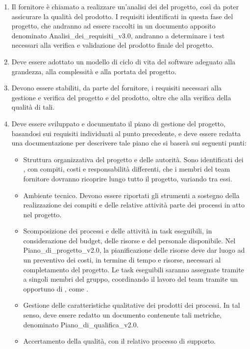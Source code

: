 \begin{enumerate}
    \item Il fornitore è chiamato a realizzare un'analisi dei  del progetto, così da poter assicurare la qualità del prodotto. I requisiti identificati in questa fase del progetto, che andranno ad essere raccolti in un documento apposito denominato Analisi\_dei\_requisiti\_v3.0, andranno a determinare i test necessari alla verifica e validazione del prodotto finale del progetto.
    \item Deve essere adottato un modello di ciclo di vita del software adeguato alla grandezza, alla complessità e alla portata del progetto.
    \item Devono essere stabiliti, da parte del fornitore, i requisiti necessari alla gestione e verifica del progetto e del prodotto, oltre che alla verifica della qualità di tali.
    \item Deve essere sviluppato e documentato il piano di gestione del progetto, basandosi sui requisiti individuati al punto precedente, e deve essere redatta una documentazione per descrivere tale piano che si baserà sui seguenti punti:
    \begin{itemize}
        \item Struttura organizzativa del progetto e delle autorità. Sono identificati dei , con compiti, costi e responsabilità differenti, che i membri del team fornitore dovranno ricoprire lungo tutto il progetto, variando tra essi.
        \item Ambiente tecnico. Devono essere riportati gli strumenti a sostegno della realizzazione dei compiti e delle relative attività parte dei processi in atto nel progetto.
        \item Scomposizione dei processi e delle attività in task eseguibili, in considerazione del budget, delle risorse e del personale disponibile. Nel Piano\_di\_progetto\_v2.0, la pianificazione delle risorse deve dar luogo ad un preventivo dei costi, in termine di tempo e risorse, necessari al completamento del progetto. Le task eseguibili saranno assegnate tramite  a singoli membri del gruppo, coordinando il lavoro del team tramite un opportuno  di , come .
        \item Gestione delle caratteristiche qualitative dei prodotti dei processi. In tal senso, deve essere redatto un documento contenente tali metriche, denominato Piano\_di\_qualifica\_v2.0.
        \item Accertamento della qualità, con il relativo processo di supporto.

\end{itemize}
\end{enumerate}
